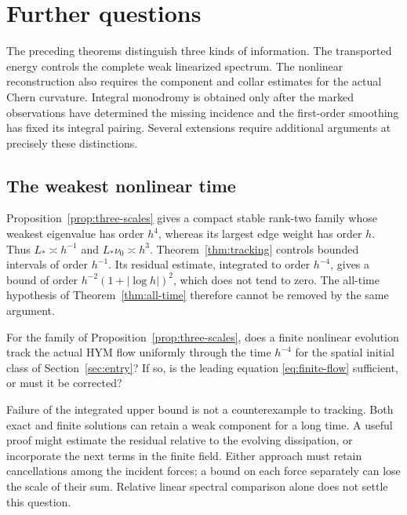 \section{Further questions}\label{sec:questions}

The preceding theorems distinguish three kinds of information.
The transported energy controls the complete weak linearized
spectrum. The nonlinear reconstruction also requires the
component and collar estimates for the actual Chern curvature.
Integral monodromy is obtained only after the marked observations
have determined the missing incidence and the first-order
smoothing has fixed its integral pairing. Several extensions
require additional arguments at precisely these distinctions.

\subsection{The weakest nonlinear time}
Proposition~\ref{prop:three-scales} gives a compact stable
rank-two family whose weakest eigenvalue has order $h^4$,
whereas its largest edge weight has order $h$.
Thus $L_*\asymp h^{-1}$ and $L_*\nu_0\asymp h^3$.
Theorem~\ref{thm:tracking} controls bounded intervals
of order $h^{-1}$. Its residual estimate, integrated
to order $h^{-4}$, gives a bound of order
$h^{-2}(1+|\log h|)^2$, which does not tend to zero.
The all-time hypothesis of Theorem~\ref{thm:all-time}
therefore cannot be removed by the same argument.

\begin{question}
For the family of Proposition~\ref{prop:three-scales},
does a finite nonlinear evolution track the actual
HYM flow uniformly through the time $h^{-4}$ for
the spatial initial class of Section~\ref{sec:entry}?
If so, is the leading equation
\eqref{eq:finite-flow} sufficient, or must it be
corrected?
\end{question}

Failure of the integrated upper bound is not a
counterexample to tracking. Both exact and finite
solutions can retain a weak component for a long
time. A useful proof might estimate the residual
relative to the evolving dissipation, or incorporate
the next terms in the finite field. Either approach
must retain cancellations among the incident
forces; a bound on each force separately can lose
the scale of their sum. Relative linear spectral
comparison alone does not settle this question.

